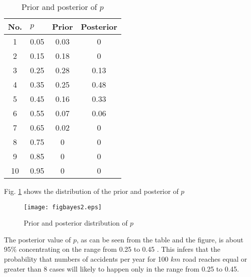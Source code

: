 \begin{table}
	\caption{Prior and posterior of $p$} \label{tblbayes1}
\begin{tabular}{|l|l|l|l|}
\hline
\multicolumn{1}{|c|}{No.} & \multicolumn{1}{m{1.5cm}|}{\centering $p$} & \multicolumn{1}{m{1.5cm}|}{\centering Prior} & \multicolumn{1}{m{1.5cm}|}{\centering Posterior} \\ 
\hline
\multicolumn{1}{|c|}{1} & \multicolumn{1}{c|}{0.05} & \multicolumn{1}{c|}{0.03} & \multicolumn{1}{c|}{0} \\ 
\hline
\multicolumn{1}{|c|}{2} & \multicolumn{1}{c|}{0.15} & \multicolumn{1}{c|}{0.18} & \multicolumn{1}{c|}{0} \\ 
\hline
\multicolumn{1}{|c|}{3} & \multicolumn{1}{c|}{0.25} & \multicolumn{1}{c|}{0.28} & \multicolumn{1}{c|}{0.13} \\ 
\hline
\multicolumn{1}{|c|}{4} & \multicolumn{1}{c|}{0.35} & \multicolumn{1}{c|}{0.25} & \multicolumn{1}{c|}{0.48} \\ 
\hline
\multicolumn{1}{|c|}{5} & \multicolumn{1}{c|}{0.45} & \multicolumn{1}{c|}{0.16} & \multicolumn{1}{c|}{0.33} \\ 
\hline
\multicolumn{1}{|c|}{6} & \multicolumn{1}{c|}{0.55} & \multicolumn{1}{c|}{0.07} & \multicolumn{1}{c|}{0.06} \\ 
\hline
\multicolumn{1}{|c|}{7} & \multicolumn{1}{c|}{0.65} & \multicolumn{1}{c|}{0.02} & \multicolumn{1}{c|}{0} \\ 
\hline
\multicolumn{1}{|c|}{8} & \multicolumn{1}{c|}{0.75} & \multicolumn{1}{c|}{0} & \multicolumn{1}{c|}{0} \\ 
\hline
\multicolumn{1}{|c|}{9} & \multicolumn{1}{c|}{0.85} & \multicolumn{1}{c|}{0} & \multicolumn{1}{c|}{0} \\ 
\hline
\multicolumn{1}{|c|}{10} & \multicolumn{1}{c|}{0.95} & \multicolumn{1}{c|}{0} & \multicolumn{1}{c|}{0} \\ 
\hline
\end{tabular}
\end{table}
Fig. \ref{figbayes2} shows the distribution of the prior and posterior of $p$
\begin{figure}[h]
\texttt{[image: figbayes2.eps]}
\caption{Prior and posterior distribution of $p$}\label{figbayes2}
\end{figure}
The posterior value of $p$, as can be seen from the table and the figure, is about 95\% concentrating on the range from 0.25 to 0.45 . This infers that the probability that numbers of accidents per year for 100 $km$ road reaches equal or greater than 8 cases will likely to happen only in the range from 0.25 to 0.45.

